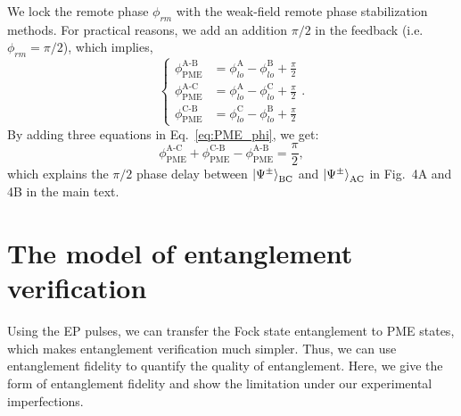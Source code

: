 \documentclass[aps,reprint,showpacs,superscriptaddress]{revtex4-2}
\begin{document}
We lock the remote phase $\phi_{rm}$ with the weak-field remote phase stabilization methods. For practical reasons, we add an addition $\pi/2$ in the feedback (i.e. $\phi_{rm}=\pi/2$), which implies,
\begin{equation}\label{eq:PME_phi}
	\begin{cases}
		\phi_\textrm{PME}^\textrm{A-B}&=\phi_{lo}^\textrm{A}-\phi_{lo}^\textrm{B}+\frac{\pi}{2}\\
		\phi_\textrm{PME}^\textrm{A-C}&=\phi_{lo}^\textrm{A}-\phi_{lo}^\textrm{C}+\frac{\pi}{2}\\
		\phi_\textrm{PME}^\textrm{C-B}&=\phi_{lo}^\textrm{C}-\phi_{lo}^\textrm{B}+\frac{\pi}{2}
	\end{cases}.
\end{equation}
By adding three equations in Eq.~\ref{eq:PME_phi}, we get:
\begin{equation}
	\phi_\textrm{PME}^\textrm{A-C}+\phi_\textrm{PME}^\textrm{C-B}-\phi_\textrm{PME}^\textrm{A-B}=\frac{\pi}{2},
\end{equation}
which explains the $\pi/2$ phase delay between $\ket{\Psi^\pm}_\textrm{BC}$ and $\ket{\Psi^\pm}_\textrm{AC}$ in Fig.~4A and 4B in the main text. 

\section{The model of entanglement verification}

Using the EP pulses, we can transfer the Fock state entanglement to PME states, which makes entanglement verification much simpler. Thus, we can use entanglement fidelity to quantify the quality of entanglement. Here, we give the form of entanglement fidelity and show the limitation under our experimental imperfections.
\end{document}
